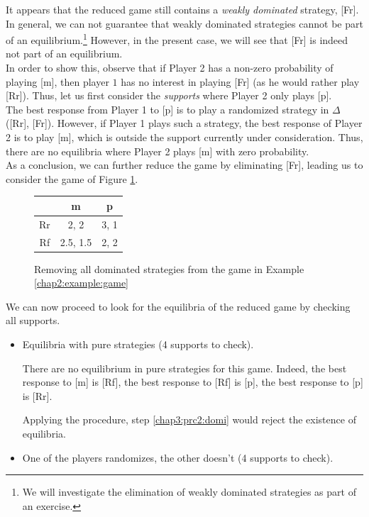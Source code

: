\begin{example}
It appears that the reduced game still contains a \emph{weakly dominated} strategy, [Fr].
In general, we can not guarantee that weakly dominated strategies cannot be part of an equilibrium.\footnote{We will investigate the elimination of weakly dominated strategies as part of an exercise.}
However, in the present case, we will see that [Fr] is indeed not part of an equilibrium.\\
In order to show this, observe that if Player 2 has a
 non-zero probability of playing [m],
  then player $1$ has no interest in playing [Fr] (as he would rather play [Rr]).
 Thus, let us first consider the \emph{supports} where Player 2 only plays  [p].\\
 The best response from Player 1 to [p] is to play a randomized strategy in $\Delta$([Rr], [Fr]).
 However, if Player 1 plays such a strategy,   the best response of Player 2 is to play [m],
  which is outside the support currently under consideration.
   Thus, there are no equilibria where Player 2 plays [m] with zero probability.\\
   As a conclusion, we can further reduce the game by eliminating [Fr], leading us to consider the game of Figure \ref{chap3:tablefromchap2-reduced2}.



\begin{figure}[!ht]
\centering
\begin{tabular}{c|cc}
 & m & p \\
\hline
Rr & 2, 2 & 3, 1 \\
Rf & 2.5, 1.5 & 2, 2
\end{tabular}
\caption{Removing all dominated strategies from the game in Example \ref{chap2:example:game}}
\label{chap3:tablefromchap2-reduced2}
\end{figure}

We can now proceed to look for the equilibria of the reduced game by checking all supports.
\begin{itemize}
\item[\textbf{Case 1:}] Equilibria with pure strategies (4 supports to check).

There are no equilibrium in pure strategies for this game. Indeed, the best response to [m] is [Rf], the best response to [Rf] is [p], the best response to [p] is [Rr].

Applying the procedure, step \ref{chap3:prc2:domi} would reject the existence of equilibria.

\item[\textbf{Case 2:}] One of the players randomizes, the other doesn't (4 supports to check).


\end{itemize}
\end{example}
